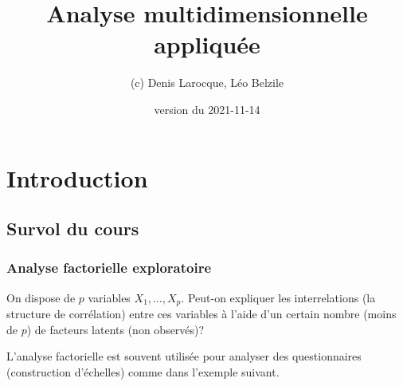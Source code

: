 \documentclass[
  11pt,
  letterpaper,
]{book}
\title{Analyse multidimensionnelle appliquée}
\author{(c) Denis Larocque, Léo Belzile}
\date{version du 2021-11-14}
\theoremstyle{definition}
\theoremstyle{definition}
\theoremstyle{definition}
\theoremstyle{definition}
\theoremstyle{remark}
\begin{document}
\maketitle

{
\setcounter{tocdepth}{1}
\tableofcontents
}
\hypertarget{introduction}{%
\chapter{Introduction}\label{introduction}}

\newcommand{\bs}[1]{\boldsymbol{#1}}
\newcommand{\eps}{\varepsilon}
\newcommand{\Rlang}{\textsf{R}}
\newcommand{\SAS}{\textsf{SAS}}
\newcommand{\Sp}{\mathscr{S}}
\renewcommand{\P}[1]{{\mathsf P}\left(#1\right)}
\newcommand{\E}[1]{{\mathsf E}\left(#1\right)}
\newcommand{\Va}[1]{{\mathsf{Var}}\left(#1\right)}
\newcommand{\Cor}[1]{{\mathsf{Cor}}\left(#1\right)}
\newcommand{\I}[1]{{\mathbf 1}_{#1}}
\newcommand{\expit}{\mathrm{expit}}
\newcommand{\logit}{\mathrm{logit}}
\newcommand{\code}[1]{\texttt{#1}}
\newcommand{\Hy}{\mathcal{H}}
\renewcommand{\d}{\mathrm{d}}

\hypertarget{survol-du-cours}{%
\section{Survol du cours}\label{survol-du-cours}}

\hypertarget{analyse-factorielle-exploratoire}{%
\subsection{Analyse factorielle exploratoire}\label{analyse-factorielle-exploratoire}}

On dispose de \(p\) variables \(X_1, \ldots, X_p\). Peut-on expliquer les interrelations (la structure de corrélation) entre ces variables à l'aide d'un certain nombre (moins de \(p\)) de facteurs latents (non observés)?

L'analyse factorielle est souvent utilisée pour analyser des questionnaires (construction d'échelles) comme dans l'exemple suivant.
\end{document}
